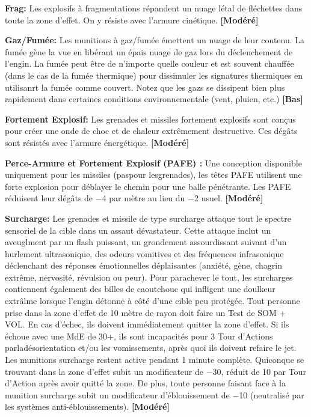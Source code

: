 \textbf{Frag:} Les explosifs à fragmentations répandent un nuage létal de fléchettes dans toute la zone d'effet. On y résiste avec l'armure cinétique. \textbf{[Modéré]} 

\textbf{Gaz/Fumée:} Les munitions à gaz/fumée émettent un nuage de leur contenu. La fumée gène la vue en libérant un épais nuage de gaz lors du déclenchement de l'engin. La fumée peut être de n'importe quelle couleur et est souvent chauffée (dans le cas de la fumée thermique) pour dissimuler les signatures thermiques en utilisanrt la fumée comme couvert. Notez que les gazs se dissipent bien plus rapidement dans certaines conditions environnementale (vent, pluien, etc.) \textbf{ [Bas]} 

\textbf{Fortement Explosif:} Les grenades et missiles fortement explosifs sont conçus pour créer une onde de choc et de chaleur extrêmement destructive. Ces dégâts sont résistés avec l'armure énergétique. \textbf{[Modéré]} 

\textbf{Perce-Armure et Fortement Explosif (PAFE) :} Une conception disponible uniquement pour les missiles (paspour lesgrenades), les têtes PAFE utilisent une forte explosion pour déblayer le chemin pour une balle pénétrante. Les PAFE réduisent leur dégâts de $-$4 par mètre au lieu du $-$2 usuel. \textbf{[Modéré]} 

\textbf{Surcharge:} Les grenades et missile de type surcharge attaque tout le spectre sensoriel de la cible dans un assaut dévastateur. Cette attaque inclut un aveuglment par un flash puissant, un grondement assourdissant suivant d'un hurlement ultrasonique, des odeurs vomitives et des fréquences infrasonique déclenchant des réponses émotionnelles déplaisantes (anxiété, gène, chagrin extrême, nervosité, révulsion ou peur). Pour parachever le tout, les surcharges contiennent également des billes de caoutchouc qui infligent une doulkeur extrâlme lorsque l'engin détonne à côté d'une cible peu protégée. Tout personne prise dans la zone d'effet de 10 mètre de rayon doit faire un Test de SOM + VOL. En cas d'échec, ils doivent immédiatement quitter la zone d'effet. Si ils échoue avec une MdE de 30+, ils sont incapacités pour 3 Tour d'Actions parladésorientation et/ou les vomissements, après quoi ils doivent refaire le jet. Les munitions surcharge restent active pendant 1 minute complète. Quiconque se trouvant dans la zone d'effet subit un modificateur de $-$30, réduit de 10 par Tour d'Action après avoir quitté la zone. De plus, toute personne faisant face à la munition surcharge subit un modificateur d'éblouissement de $-$10 (neutralisé par les systèmes anti-éblouissements). \textbf{[Modéré]} 

